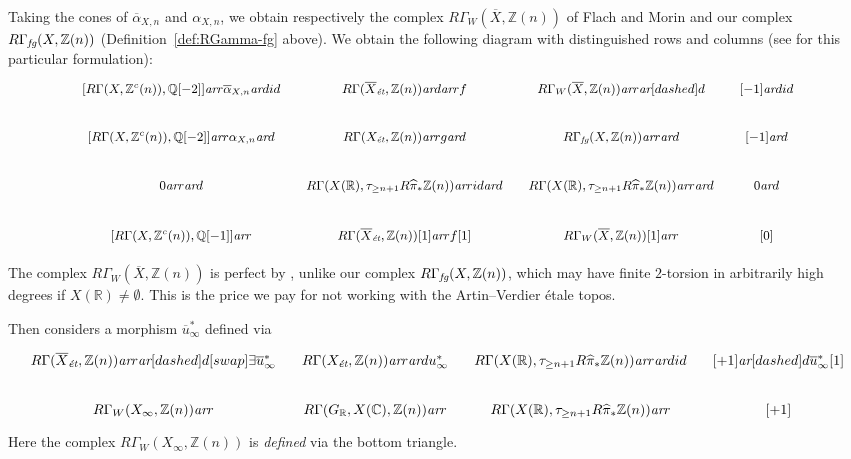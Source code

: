 \documentclass[leqno,12pt]{article}
\theoremstyle{plain}
\theoremstyle{definition}
\newcommand{\CC}{\mathbb{C}}
\newcommand{\QQ}{\mathbb{Q}}
\newcommand{\RR}{\mathbb{R}}
\newcommand{\ZZ}{\mathbb{Z}}
\newcommand{\ar}{\text{\it ar}}
\newcommand{\et}{\text{\it \'{e}t}}
\newcommand{\fg}{\text{\it fg}}
\begin{document}
Taking the cones of $\overline{\alpha}_{X,n}$ and $\alpha_{X,n}$, we obtain
respectively the complex $R\Gamma_W (\overline{X}, \ZZ (n))$ of Flach and Morin
\cite[Definition~3.6]{Flach-Morin-2018} and our complex
$R\Gamma_\fg (X, \ZZ(n))$ (Definition~\ref{def:RGamma-fg} above). We obtain the
following diagram with distinguished rows and columns
(see \cite[Proposition~1.4.6]{Neeman-2001} for this particular formulation):
\begin{equation}
  \label{eqn:cones-of-alphas}
  \begin{tikzcd}[column sep=1em,font=\small]
    {[R\Gamma (X, \ZZ^c (n)), \QQ [-2]]} \ar{r}{\overline{\alpha}_{X,n}}\ar{d}{id} & R\Gamma (\overline{X}_\et, \ZZ(n))\ar{d}\ar{r}{f} & R\Gamma_W (\overline{X}, \ZZ(n)) \ar{r}\ar[dashed]{d} & {[-1]}\ar{d}{id} \\
    {[R\Gamma (X, \ZZ^c (n)), \QQ [-2]]} \ar{r}{\alpha_{X,n}}\ar{d} & R\Gamma (X_\et, \ZZ(n)) \ar{r}{g}\ar{d} & R\Gamma_\fg (X, \ZZ(n)) \ar{r}\ar{d} & {[-1]}\ar{d} \\
    0\ar{r}\ar{d} & R\Gamma (X (\RR), \tau_{\ge n+1} R \widehat{\pi}_* \ZZ (n)) \ar{r}{id}\ar{d} & R\Gamma (X (\RR), \tau_{\ge n+1} R \widehat{\pi}_* \ZZ (n)) \ar{r}\ar{d} & 0\ar{d} \\
    {[R\Gamma (X, \ZZ^c (n)), \QQ [-1]]} \ar{r} & R\Gamma (\overline{X}_\et, \ZZ(n))[1]\ar{r}{f[1]} & R\Gamma_W (\overline{X}, \ZZ(n))[1] \ar{r} & {[0]}
  \end{tikzcd}
\end{equation}

The complex $R\Gamma_W (\overline{X}, \ZZ(n))$ is perfect by
\cite[Proposition~3.8]{Flach-Morin-2018}, unlike our complex
$R\Gamma_\fg (X, \ZZ(n))$,
which may have finite $2$-torsion in arbitrarily high degrees if
$X (\RR) \ne \emptyset$. This is the price we pay for not working with
the Artin--Verdier \'{e}tale topos.

Then \cite[Definition~3.23]{Flach-Morin-2018} considers a morphism
$\overline{u}^*_\infty$ defined via
\begin{equation}
  \label{eqn:definition-of-u-bar-infty}
  \begin{tikzcd}[column sep=1em]
    R\Gamma (\overline{X}_\et, \ZZ(n)) \ar{r}\ar[dashed]{d}[swap]{\exists}{\overline{u}_\infty^*} & R\Gamma (X_\et, \ZZ(n)) \ar{r}\ar{d}{u_\infty^*} & R\Gamma (X(\RR), \tau_{\ge n+1} R \widehat{\pi}_* \ZZ (n)) \ar{r}\ar{d}{id} & {[+1]} \ar[dashed]{d}{\overline{u}_\infty^* [1]} \\
    R\Gamma_W (X_\infty, \ZZ (n)) \ar{r} & R\Gamma (G_\RR, X (\CC), \ZZ (n)) \ar{r} & R\Gamma (X(\RR), \tau_{\ge n+1} R \widehat{\pi}_* \ZZ (n)) \ar{r} & {[+1]}
  \end{tikzcd}
\end{equation}
Here the complex $R\Gamma_W (X_\infty, \ZZ(n))$ is \emph{defined} via the bottom
triangle.
\end{document}
